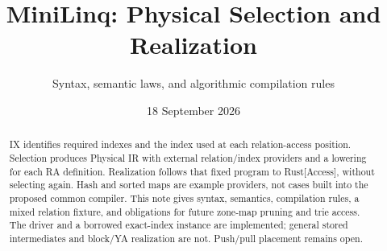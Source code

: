 
\title{MiniLinq: Physical Selection and Realization}
\author{Syntax, semantic laws, and algorithmic compilation rules}
\date{18 September 2026}

\maketitle
\begin{abstract}
IX identifies required indexes and the index used at each relation-access
position. Selection produces Physical IR with external relation/index providers
and a lowering for each RA definition. Realization follows that fixed program
to Rust[Access], without selecting again. Hash and sorted maps are example
providers, not cases built into the proposed common compiler.
This note gives syntax, semantics, compilation rules, a mixed
relation fixture, and obligations for future zone-map pruning and trie access.
The driver and a borrowed exact-index instance are implemented; general stored
intermediates and block/YA realization are not. Push/pull placement remains open.
\end{abstract}




